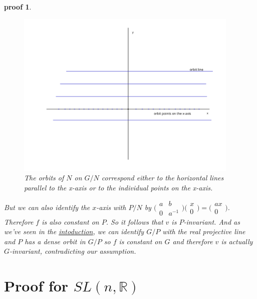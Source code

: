 \documentclass[
  12pt
]{article}
\theoremstyle{break}
\theoremstyle{plain}
\newtheorem*{pf}{proof}
\newcommand{\G}{\ensuremath{G}\xspace}
\newcommand{\ipmatrix}[1]{%
\ensuremath{\big(\begin{smallmatrix} #1 \end{smallmatrix}\big)}\xspace}
\begin{document}
\begin{pf}
    \begin{figure}
      \begin{center}
        \includegraphics[width=0.95\textwidth]{N-orbits-in-R2-1.png}
      \end{center}
      \caption{The orbits of $N$ on $G/N$ correspond either to the horizontal lines parallel to the x-axis or to the individual points on the x-axis. }
      \label{fig:n-orbits-in-r2}
    \end{figure}

    But we can also identify the $x$-axis with $P/N$ by $\ipmatrix{a & b \\ 0 &
    a^{-1}}\ipmatrix{x \\ 0} = \ipmatrix{ax \\ 0}$. Therefore $f$ is also
    constant on $P$. So it follows that $v$ is $P$-invariant. And as we've seen
    in the \hyperref[sec:introduction]{intoduction}, we can identify $G/P$ with
    the real projective line and $P$ has a dense orbit in $G/P$ so $f$ is
    constant on $G$ and therefore $v$ is actually \G-invariant, contradicting our
    assumption.
  \end{pf}



\hypertarget{proof-for-slnr}{%
  \section{Proof for \texorpdfstring{$SL(n, \mathbb{R})$}{SL(n, R)}}
\label{proof-for-slnr}}
\end{document}
